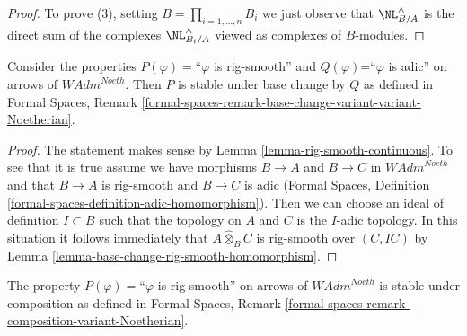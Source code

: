 \begin{proof}
\medskip\noindent
To prove (3), setting $B = \prod_{i = 1, \ldots, n} B_i$
we just observe that $\NL_{B/A}^\wedge$ is the direct
sum of the complexes $\NL_{B_i/A}^\wedge$ viewed as complexes
of $B$-modules.
\end{proof}

\begin{lemma}
\label{lemma-base-change-rig-smooth-continuous}
Consider the properties $P(\varphi)=$``$\varphi$ is rig-smooth''
and $Q(\varphi)$=``$\varphi$ is adic'' on arrows of $\textit{WAdm}^{Noeth}$.
Then $P$ is stable under base change by $Q$ as defined in
Formal Spaces, Remark
\ref{formal-spaces-remark-base-change-variant-variant-Noetherian}.
\end{lemma}

\begin{proof}
The statement makes sense by Lemma \ref{lemma-rig-smooth-continuous}.
To see that it is true assume we have morphisms
$B \to A$ and $B \to C$ in $\textit{WAdm}^{Noeth}$
and that $B \to A$ is rig-smooth and $B \to C$ is adic
(Formal Spaces, Definition
\ref{formal-spaces-definition-adic-homomorphism}).
Then we can choose an ideal of definition $I \subset B$
such that the topology on $A$ and $C$ is the $I$-adic topology.
In this situation it follows immediately that
$A \widehat{\otimes}_B C$ is rig-smooth over $(C, IC)$ by
Lemma \ref{lemma-base-change-rig-smooth-homomorphism}.
\end{proof}

\begin{lemma}
\label{lemma-composition-rig-smooth-continuous}
The property $P(\varphi)=$``$\varphi$ is rig-smooth''
on arrows of $\textit{WAdm}^{Noeth}$ is stable under composition
as defined in Formal Spaces, Remark
\ref{formal-spaces-remark-composition-variant-Noetherian}.
\end{lemma}

